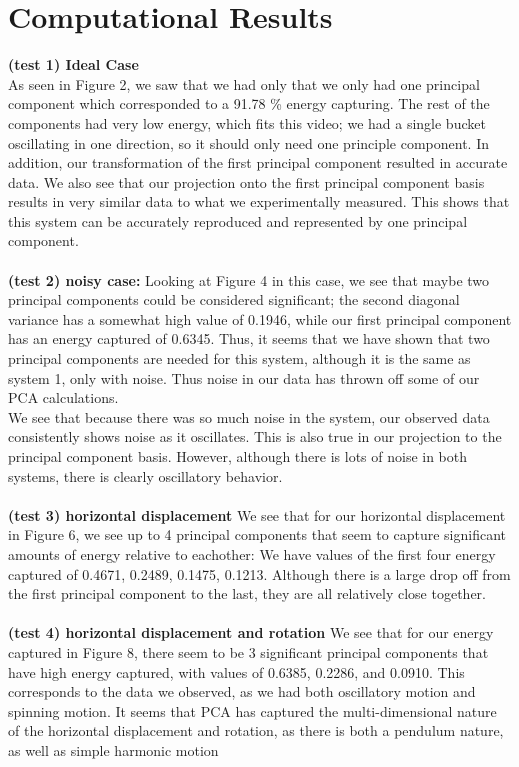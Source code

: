 \documentclass{article}
\begin{document}
\section*{\fontsize{19}{15}\selectfont Computational Results}
	\textbf{(test 1) Ideal Case} \\ 
As seen in Figure 2, we saw that we had only that we only had one principal component which corresponded to a 91.78 \% energy capturing. The rest of the components had very low energy, which fits this video; we had a single bucket oscillating in one direction, so it should only need one principle component. In addition, our transformation of the first principal component resulted in accurate data. We also see that our projection onto the first principal component basis results in very similar data to what we experimentally measured. This shows that this system can be accurately reproduced and represented by one principal component. \\ \\
\textbf{(test 2) noisy case:}
Looking at Figure 4 in this case, we see that maybe two principal components could be considered significant; the second diagonal variance has a somewhat high value of 0.1946, while our first principal component has an energy captured of 0.6345. Thus, it seems that we have shown that two principal components are needed for this system, although it is the same as system 1, only with noise. Thus noise in our data has thrown off some of our PCA calculations. \\
We see that because there was so much noise in the system, our observed data consistently shows noise as it oscillates. This is also true in our projection to the principal component basis. However, although there is lots of noise in both systems, there is clearly oscillatory behavior. \\ \\
\textbf{(test 3) horizontal displacement}
We see that for our horizontal displacement in Figure 6, we see up to 4 principal components that seem to capture significant amounts of energy relative to eachother: We have values of the first four energy captured of 0.4671, 0.2489, 0.1475, 0.1213. Although there is a large drop off from the first principal component to the last, they are all relatively close together. \\ \\
\textbf{(test 4) horizontal displacement and rotation}
We see that for our energy captured in Figure 8, there seem to be 3 significant principal components that have high energy captured, with values of  0.6385, 0.2286, and 0.0910. This corresponds to the data we observed, as we had both oscillatory motion and spinning motion. It seems that PCA has captured the multi-dimensional nature of the horizontal displacement and rotation, as there is both a pendulum nature, as well as simple harmonic motion
\end{document}
